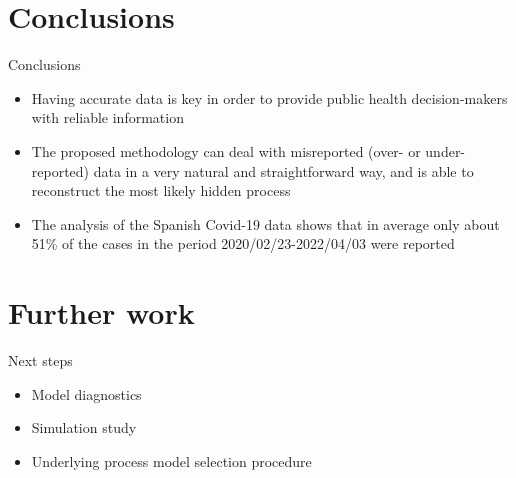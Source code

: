 \documentclass[aspectratio=169,usepdftitle=true]{beamer}
\begin{document}
\section{Conclusions}


\begin{frame}{Conclusions}
\begin{itemize}
\item Having accurate data is key in order to provide public health decision-makers with reliable information
\item The proposed methodology can deal with misreported (over- or under-reported) data in a very natural and straightforward way, and is able to reconstruct the most likely hidden process
\item The analysis of the Spanish Covid-19 data shows that in average only about 51\% of the cases in the period 2020/02/23-2022/04/03 were reported
\end{itemize}
\end{frame}

\section{Further work}
\begin{frame}{Next steps}
\begin{itemize}
 \item Model diagnostics
 \item Simulation study
 \item Underlying process model selection procedure
\end{itemize}
\end{frame}
\end{document}
